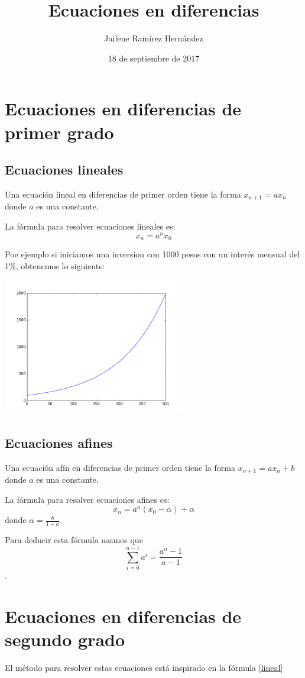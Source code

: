 \documentclass{article}
\title{Ecuaciones en diferencias}
\author{Jailene Ramírez Hernández}
\date{18 de septiembre de 2017}
\begin{document}
\maketitle

\section{Ecuaciones en diferencias de primer grado}

\subsection{Ecuaciones lineales}

Una ecuación lineal en diferencias de primer orden tiene la forma $x_{n+1}=ax_n$ donde $a$ es una constante.

La fórmula para resolver ecuaciones lineales es:
\begin{equation}
  \label{lineal}
  x_n=a^nx_0
\end{equation}

Poe ejemplo si iniciamos una inversion con 1000 pesos con un interés mensual del 1\%, obtenemos lo siguiente:

\begin{center}
  \includegraphics[width=8cm]{inversion.png}
\end{center}


\subsection{Ecuaciones afines}

Una ecuación afín en diferencias de primer orden tiene la forma $x_{n+1}=ax_n+b$ donde $a$ es una constante.

La fórmula para resolver ecuaciones afines es:
\begin{equation}
  \label{afin}
  x_n=a^n(x_0-\alpha)+\alpha
\end{equation}
donde $\alpha=\frac{b}{1-a}$.

Para deducir esta fórmula usamos que $$\sum_{i=0}^{n-1}a^i=\frac{a^n-1}{a-1}$$.

\section{Ecuaciones en diferencias de segundo grado}

El método para resolver estas ecuaciones está inspirado en la fórmula \ref{lineal}
\end{document}
